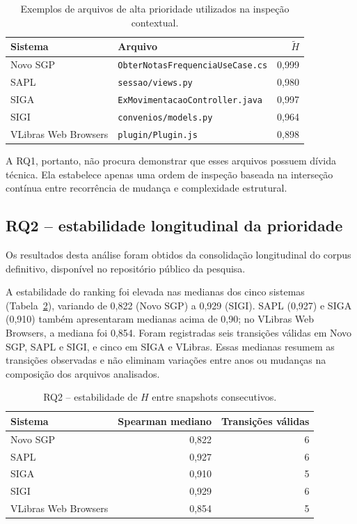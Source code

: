 \documentclass[12pt]{article}
\begin{document}
\begin{table}[H]
\centering
\caption{Exemplos de arquivos de alta prioridade utilizados na inspeção contextual.}
\label{tab:rq1}
\small
\begin{tabular}{lp{7.2cm}r}
\toprule
\textbf{Sistema} & \textbf{Arquivo} & \textbf{$\widetilde H$} \\
\midrule
Novo SGP & \texttt{ObterNotasFrequenciaUseCase.cs} & 0,999 \\
SAPL & \texttt{sessao/views.py} & 0,980 \\
SIGA & \texttt{ExMovimentacaoController.java} & 0,997 \\
SIGI & \texttt{convenios/models.py} & 0,964 \\
VLibras Web Browsers & \texttt{plugin/Plugin.js} & 0,898 \\
\bottomrule
\end{tabular}
\end{table}
A RQ1, portanto, não procura demonstrar que esses arquivos possuem dívida técnica. Ela estabelece apenas uma ordem de inspeção baseada na interseção contínua entre recorrência de mudança e complexidade estrutural.

\subsection{RQ2 -- estabilidade longitudinal da prioridade}
Os resultados desta análise foram obtidos da consolidação longitudinal do corpus definitivo, disponível no repositório público da pesquisa.

A estabilidade do ranking foi elevada nas medianas dos cinco sistemas (Tabela~\ref{tab:rq2}), variando de 0,822 (Novo SGP) a 0,929 (SIGI). SAPL (0,927) e SIGA (0,910) também apresentaram medianas acima de 0,90; no VLibras Web Browsers, a mediana foi 0,854. Foram registradas seis transições válidas em Novo SGP, SAPL e SIGI, e cinco em SIGA e VLibras. Essas medianas resumem as transições observadas e não eliminam variações entre anos ou mudanças na composição dos arquivos analisados.

\begin{table}[H]
\centering
\caption{RQ2 -- estabilidade de $H$ entre snapshots consecutivos.}
\label{tab:rq2}
\begin{tabular}{lrr}
\toprule
\textbf{Sistema} & \textbf{Spearman mediano} & \textbf{Transições válidas} \\
\midrule
Novo SGP & 0,822 & 6 \\
SAPL & 0,927 & 6 \\
SIGA & 0,910 & 5 \\
SIGI & 0,929 & 6 \\
VLibras Web Browsers & 0,854 & 5 \\
\bottomrule
\end{tabular}
\end{table}
\end{document}
